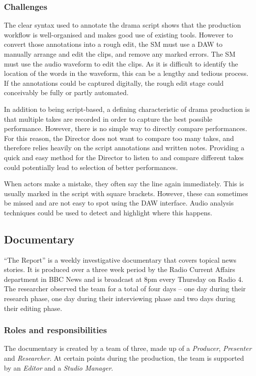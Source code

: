 \subsubsection{Challenges}
The clear syntax used to annotate the drama script shows that the production workflow is well-organised and makes good
use of existing tools. However to convert those annotations into a rough edit, the SM must use a DAW to manually
arrange and edit the clips, and remove any marked errors. The SM must use the audio waveform to edit the clips.  As it
is difficult to identify the location of the words in the waveform, this can be a lengthy and tedious process. If the
annotations could be captured digitally, the rough edit stage could conceivably be fully or partly automated.

In addition to being script-based, a defining characteristic of drama production is that multiple takes are recorded in
order to capture the best possible performance. However, there is no simple way to directly compare performances. For
this reason, the Director does not want to compare too many takes, and therefore relies heavily on the script
annotations and written notes. Providing a quick and easy method for the Director to listen to and compare different
takes could potentially lead to selection of better performances.

When actors make a mistake, they often say the line again immediately. This is usually marked in the script with square
brackets. However, these can sometimes be missed and are not easy to spot using the DAW interface.  Audio analysis
techniques could be used to detect and highlight where this happens.


\subsection{Documentary}\label{sec:doc}
``The Report'' is a weekly investigative documentary that covers topical news stories. It is produced over a three week
period by the Radio Current Affairs department in BBC News and is broadcast at 8pm every Thursday on Radio 4. The
researcher observed the team for a total of four days -- one day during their research phase, one day during their
interviewing phase and two days during their editing phase.

\subsubsection{Roles and responsibilities}
The documentary is created by a team of three, made up of a \textit{Producer}, \textit{Presenter} and
\textit{Researcher}.  At certain points during the production, the team is supported by an \textit{Editor} and
a \textit{Studio Manager}.

